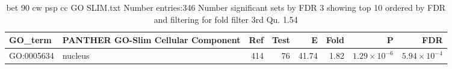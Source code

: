 \begin{table}[ht]
\centering
\begin{adjustbox}{width=\textwidth}
\begin{tabular}{llrrrrrr}
  \hline
GO\_term & PANTHER GO-Slim Cellular Component & Ref & Test & E & Fold & P & FDR \\ 
  \hline
GO:0005634 & nucleus  & 414 & 76 & 41.74 & 1.82 & $1.29 \times 10^{-6}$ & $5.94 \times 10^{-4}$ \\ 
  \hline
\end{tabular}
\end{adjustbox}
\caption{bet 90 cw psp cc GO SLIM.txt Number entries:346 Number significant sets by FDR 3 showing top 10 ordered by FDR and filtering for fold filter 3rd Qu. 1.54} 
\label{tab:bet 90 cw psp cc GO SLIM.txt Number entries:346 Number significant sets by FDR 3 showing top 10 ordered by FDR and filtering for fold filter 3rd Qu. 1.54}
\end{table}








